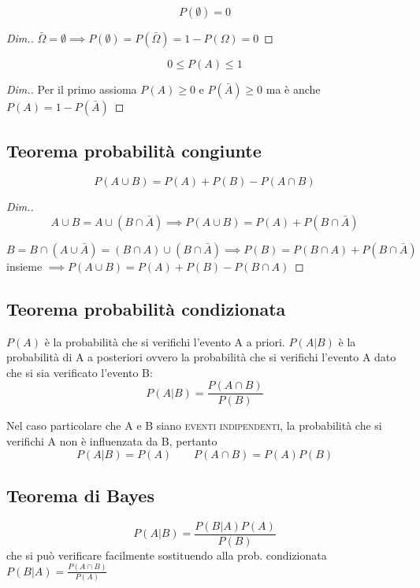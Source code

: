 \begin{equation}
	P(\emptyset)=0
\end{equation}

\begin{proof}[Dim.]
$\bar{\Omega}=\emptyset\implies P(\emptyset)=P(\bar{\Omega})=1-P(\Omega)=0$
\end{proof}

\begin{equation}
0\leq P(A)\leq 1
\end{equation}

\begin{proof}[Dim.]
Per il primo assioma $P(A)\geq 0$ e $P(\bar{A})\geq 0$ ma è anche $P(A)=1-P(\bar{A})$
\end{proof}

\subsection{Teorema probabilità congiunte}
\begin{equation}
	P(A\cup B)=P(A)+P(B)-P(A\cap B)
\end{equation}

\begin{proof}[Dim.]
\[
	A\cup B=A\cup(B\cap\bar{A})\implies P(A\cup B)=P(A)+P(B\cap\bar{A})
\]

\[
	B=B\cap(A\cup\bar{A})=(B\cap A)\cup(B\cap\bar{A})\implies P(B)=P(B\cap A)+P(B\cap\bar{A})
\]
insieme $\implies P(A\cup B)=P(A)+P(B)-P(B\cap A)$
\end{proof}

\subsection{Teorema probabilità condizionata}
$P(A)$ è la probabilità che si verifichi l'evento A a priori.
$P(A|B)$ è la probabilità di A a posteriori ovvero la probabilità che si verifichi l'evento A dato che si sia verificato l'evento B:
\begin{equation}
	P(A|B)=\frac{P(A\cap B)}{P(B)}
\end{equation}

Nel caso particolare che A e B siano \textsc{eventi indipendenti}, la probabilità che si verifichi A non è influenzata da B, pertanto
\[
	P(A|B)=P(A)\qquad P(A\cap B)=P(A)P(B)
\]

\subsection{Teorema di Bayes}
\begin{equation}
	P(A|B)=\frac{P(B|A)P(A)}{P(B)}
\end{equation}
che si può verificare facilmente sostituendo alla prob. condizionata $P(B|A)=\frac{P(A\cap B)}{P(A)}$

